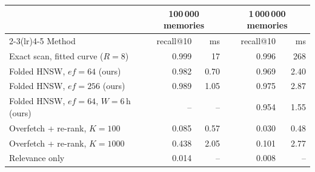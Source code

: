 \begin{tabular}{l rr rr}
\toprule
 & \multicolumn{2}{c}{100\,000 memories} & \multicolumn{2}{c}{1\,000\,000 memories}\\
\cmidrule(lr){2-3}\cmidrule(lr){4-5}
Method & recall@10 & ms & recall@10 & ms\\
\midrule
Exact scan, fitted curve ($R{=}8$) & 0.999 & 17 & 0.996 & 268\\
Folded HNSW, $ef{=}64$ (ours) & 0.982 & 0.70 & 0.969 & 2.40\\
Folded HNSW, $ef{=}256$ (ours) & 0.989 & 1.05 & 0.975 & 2.87\\
Folded HNSW, $ef{=}64$, $W{=}6$\,h (ours) & -- & -- & 0.954 & 1.55\\
Overfetch + re-rank, $K{=}100$ & 0.085 & 0.57 & 0.030 & 0.48\\
Overfetch + re-rank, $K{=}1000$ & 0.438 & 2.05 & 0.101 & 2.77\\
Relevance only & 0.014 & -- & 0.008 & --\\
\bottomrule
\end{tabular}
